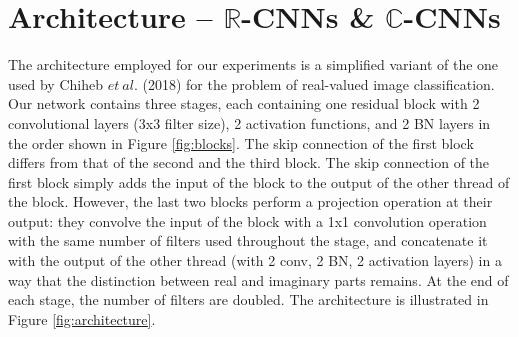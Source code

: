  \section{Architecture -- $\mathbb{R}$-CNNs \& $\mathbb{C}$-CNNs}\label{archdesc}
 The architecture employed for our experiments is a simplified variant of the one used by Chiheb $et \ al.$ (2018) \cite{trabelsi2018deep} for the problem of real-valued image classification. Our network contains three stages, each containing one residual block with 2 convolutional layers (3x3 filter size), 2 activation functions, and 2 BN layers in the order shown in Figure \ref{fig:blocks}. The skip connection of the first block differs from that of the second and the third block. The skip connection of the first block simply adds the input of the block to the output of the other thread of the block. However, the last two blocks perform a projection operation at their output: they convolve the input of the block with a 1x1 convolution operation with the same number of filters used throughout the stage, and concatenate it with the output of the other thread (with 2 conv, 2 BN, 2 activation layers) in a way that the distinction between real and imaginary parts remains. At the end of each stage, the number of filters are doubled. The architecture is illustrated in Figure \ref{fig:architecture}.
 

